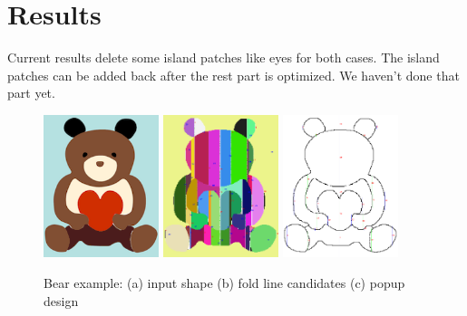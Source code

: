 \section{Results}

Current results delete some island patches like eyes for both cases. The island patches can be added back after the rest part is optimized. We haven't done that part yet.

\begin{figure}[h]
  \includegraphics[width = 0.3\textwidth]{Figures/bear/bear_ill}
  \includegraphics[width = 0.3\textwidth]{Figures/bear/popup_graph}
  \includegraphics[width = 0.3\textwidth]{Figures/bear/optimized_popup_graph}
  \caption{Bear example: (a) input shape (b) fold line candidates (c) popup design}
  \label{fig:stable}
\end{figure}

